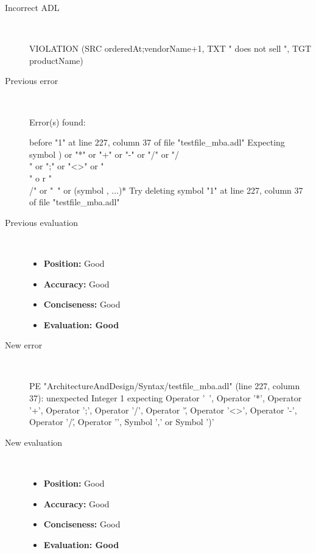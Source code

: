 \hrulefill

\begin{description}
  \item[Incorrect ADL]~\\
\begin{adl}
VIOLATION (SRC orderedAt;vendorName+1, TXT " does not sell ", TGT productName)\end{adl}
  \item[Previous error]~\\
\begin{haskell}
Error(s) found:

before "1" at line 227, column 37 of file "testfile_mba.adl"
Expecting symbol ) or "*" or "+" or "-" or "/" or "/\\" or ";" or "<>" or "\\" o
r "\\/" or "~" or (symbol , ...)*
Try deleting symbol "1" at line 227, column 37 of file "testfile_mba.adl"

\end{haskell}
  \item[Previous evaluation]~\\
    \begin{itemize}
    \item \textbf{Position:} Good
    \item \textbf{Accuracy:} Good
    \item \textbf{Conciseness:} Good
    \item \textbf{Evaluation: Good}
    \end{itemize}
  \item[New error]~\\
\begin{haskell}
PE "ArchitectureAndDesign/Syntax/testfile_mba.adl" (line 227, column 37):
unexpected Integer 1
expecting Operator '~', Operator '*', Operator '+', Operator ';', Operator '/', Operator '\', Operator '<>', Operator '-', Operator '/\', Operator '\/', Symbol ',' or Symbol ')'\end{haskell}
  \item[New evaluation]~\\
    \begin{itemize}
    \item \textbf{Position:} Good
    \item \textbf{Accuracy:} Good
    \item \textbf{Conciseness:} Good
    \item \textbf{Evaluation: Good}
    \end{itemize}
  \end{description}


